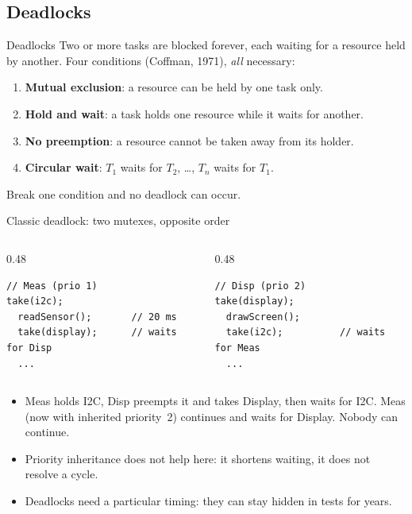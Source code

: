 \subsection{Deadlocks}
\begin{frame}{Deadlocks}
  Two or more tasks are blocked forever, each waiting for a resource held by another. Four conditions (Coffman, 1971), \emph{all} necessary:
  \begin{enumerate}
    \item \textbf{Mutual exclusion}: a resource can be held by one task only.
    \item \textbf{Hold and wait}: a task holds one resource while it waits for another.
    \item \textbf{No preemption}: a resource cannot be taken away from its holder.
    \item \textbf{Circular wait}: $T_1$ waits for $T_2$, \dots, $T_n$ waits for $T_1$.
  \end{enumerate}
  Break one condition and no deadlock can occur.
\end{frame}

\begin{frame}[fragile]{Classic deadlock: two mutexes, opposite order}
  \begin{columns}[T]
    \begin{column}{0.48\textwidth}
\begin{lstlisting}
// Meas (prio 1)
take(i2c);
  readSensor();       // 20 ms
  take(display);      // waits for Disp
  ...
\end{lstlisting}
    \end{column}
    \begin{column}{0.48\textwidth}
\begin{lstlisting}
// Disp (prio 2)
take(display);
  drawScreen();
  take(i2c);          // waits for Meas
  ...
\end{lstlisting}
    \end{column}
  \end{columns}
  \begin{itemize}
    \item Meas holds I2C, Disp preempts it and takes Display, then waits for I2C. Meas (now with inherited priority~2) continues and waits for Display. Nobody can continue.
    \item Priority inheritance does not help here: it shortens waiting, it does not resolve a cycle.
    \item Deadlocks need a particular timing: they can stay hidden in tests for years.
  \end{itemize}
\end{frame}

